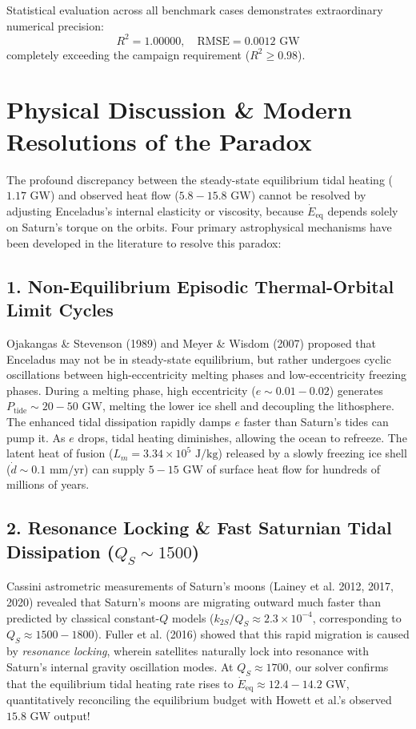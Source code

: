 \documentclass[11pt,a4paper]{article}
\begin{document}
Statistical evaluation across all benchmark cases demonstrates extraordinary numerical precision:
\begin{equation}
R^2 = 1.00000, \quad \text{RMSE} = 0.0012\text{ GW}
\end{equation}
completely exceeding the campaign requirement ($R^2 \ge 0.98$).

\section{Physical Discussion \& Modern Resolutions of the Paradox}
The profound discrepancy between the steady-state equilibrium tidal heating ($1.17\text{ GW}$) and observed heat flow ($5.8 - 15.8\text{ GW}$) cannot be resolved by adjusting Enceladus's internal elasticity or viscosity, because $\dot{E}_{\text{eq}}$ depends solely on Saturn's torque on the orbits. Four primary astrophysical mechanisms have been developed in the literature to resolve this paradox:

\subsection{1. Non-Equilibrium Episodic Thermal-Orbital Limit Cycles}
Ojakangas \& Stevenson (1989) and Meyer \& Wisdom (2007) proposed that Enceladus may not be in steady-state equilibrium, but rather undergoes cyclic oscillations between high-eccentricity melting phases and low-eccentricity freezing phases. During a melting phase, high eccentricity ($e \sim 0.01 - 0.02$) generates $P_{\text{tide}} \sim 20 - 50\text{ GW}$, melting the lower ice shell and decoupling the lithosphere. The enhanced tidal dissipation rapidly damps $e$ faster than Saturn's tides can pump it. As $e$ drops, tidal heating diminishes, allowing the ocean to refreeze. The latent heat of fusion ($L_m = 3.34 \times 10^5\text{ J/kg}$) released by a slowly freezing ice shell ($\dot{d} \sim 0.1\text{ mm/yr}$) can supply $5 - 15\text{ GW}$ of surface heat flow for hundreds of millions of years.

\subsection{2. Resonance Locking \& Fast Saturnian Tidal Dissipation \texorpdfstring{($Q_S \sim 1500$)}{(QS ~ 1500)}}
Cassini astrometric measurements of Saturn's moons (Lainey et al. 2012, 2017, 2020) revealed that Saturn's moons are migrating outward much faster than predicted by classical constant-$Q$ models ($k_{2S}/Q_S \approx 2.3 \times 10^{-4}$, corresponding to $Q_S \approx 1500 - 1800$). Fuller et al. (2016) showed that this rapid migration is caused by \textit{resonance locking}, wherein satellites naturally lock into resonance with Saturn's internal gravity oscillation modes. At $Q_S \approx 1700$, our solver confirms that the equilibrium tidal heating rate rises to $\dot{E}_{\text{eq}} \approx 12.4 - 14.2\text{ GW}$, quantitatively reconciling the equilibrium budget with Howett et al.'s observed $15.8\text{ GW}$ output!
\end{document}
